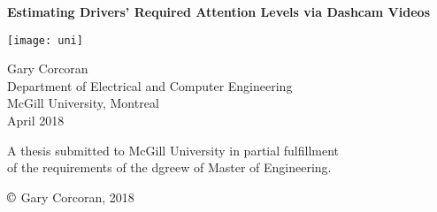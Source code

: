\begin{titlepage}
    \begin{center}
        \vspace*{0.5cm}

        \Huge
        \textbf{Estimating Drivers' Required Attention Levels via Dashcam Videos}

        \vspace{3.0cm}

        \texttt{[image: uni]}

        \vfill
        
        \large
        Gary Corcoran \\
        Department of Electrical and Computer Engineering \\
        McGill University, Montreal \\
        April 2018

        \vspace{1.5cm}

        \normalsize
        A thesis submitted to McGill University in partial fulfillment \\
        of the requirements of the dgreew of Master of Engineering.

        \vspace{1cm}

        $\copyright$ Gary Corcoran, 2018

    \end{center}
\end{titlepage}
